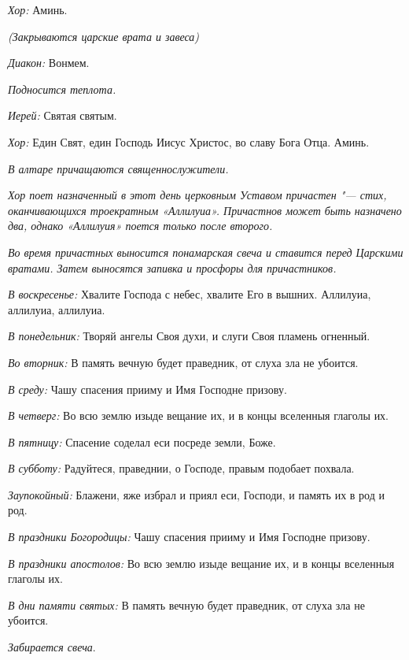 \begin{mymulticols}
{\itshape Хор:} Аминь.

{\itshape (Закрываются царские врата и завеса)}

{\itshape Диакон:} Вонмем. 

{\itshape Подносится теплота.}

{\itshape Иерей:} Святая святым. 

{\itshape Хор:} Един Свят, един Господь Иисус Христос, во славу Бога Отца. Аминь. 


{\itshape В алтаре причащаются священнослужители. }

{\itshape Хор поет назначенный в этот день церковным Уставом причастен "--- стих, оканчивающихся троекратным «Аллилуиа». Причастнов может быть назначено два, однако «Аллилуия» поется только после второго.}


{\itshape Во время причастных выносится понамарская свеча и ставится перед Царскими вратами. Затем выносятся запивка и просфоры для причастников.}

{\itshape В воскресенье:} Хвалите Господа с небес, хвалите Его в вышних. Аллилуиа, аллилуиа, аллилуиа. 

{\itshape В понедельник:} Творяй ангелы Своя духи, и слуги Своя пламень огненный. 

{\itshape Во вторник:} В память вечную будет праведник, от слуха зла не убоится. 

{\itshape В среду:} Чашу спасения прииму и Имя Господне призову. 

{\itshape В четверг:} Во всю землю изыде вещание их, и в концы вселенныя глаголы их. 

{\itshape В пятницу:} Спасение соделал еси посреде земли, Боже. 

{\itshape В субботу:} Радуйтеся, праведнии, о Господе, правым подобает похвала. 

{\itshape Заупокойный:} Блажени, яже избрал и приял еси, Господи, и память их в род и род. 

{\itshape В праздники Богородицы:} Чашу спасения прииму и Имя Господне призову. 

{\itshape В праздники апостолов:} Во всю землю изыде вещание их, и в концы вселенныя глаголы их. 

{\itshape В дни памяти святых:} В память вечную будет праведник, от слуха зла не убоится. 

{\itshape  Забирается свеча}.


\end{mymulticols}
